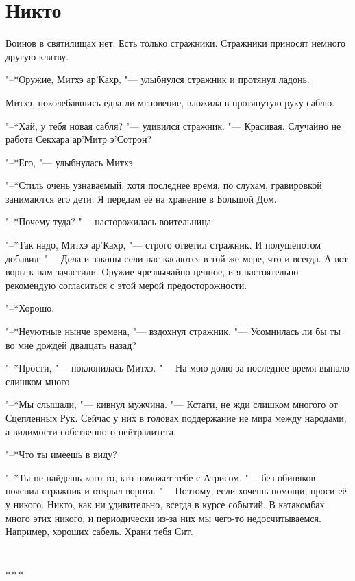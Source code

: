 \documentclass[a4paper,10pt,fleqn]{book}
\newcommand{\razd}{~\\{\centering\Large\bfseries$\ast \ast \ast$\par}~\\}
\begin{document}
\section{Никто}

Воинов в святилищах нет.
Есть только стражники.
Стражники приносят немного другую клятву.

"--*Оружие, Митхэ ар'Кахр, "--- улыбнулся стражник и протянул ладонь.

Митхэ, поколебавшись едва ли мгновение, вложила в протянутую руку саблю.

"--*Хай, у тебя новая сабля? "--- удивился стражник.
"--- Красивая.
Случайно не работа Секхара ар'Митр э'Сотрон?

"--*Его, "--- улыбнулась Митхэ.

"--*Стиль очень узнаваемый, хотя последнее время, по слухам, гравировкой занимаются его дети.
Я передам её на хранение в Большой Дом.

"--*Почему туда? "--- насторожилась воительница.

"--*Так надо, Митхэ ар'Кахр, "--- строго ответил стражник.
И полушёпотом добавил:
"--- Дела и законы сели нас касаются в той же мере, что и всегда.
А вот воры к нам зачастили.
Оружие чрезвычайно ценное, и я настоятельно рекомендую согласиться с этой мерой предосторожности.

"--*Хорошо.

"--*Неуютные нынче времена, "--- вздохнул стражник.
"--- Усомнилась ли бы ты во мне дождей двадцать назад?

"--*Прости, "--- поклонилась Митхэ.
"--- На мою долю за последнее время выпало слишком много.

"--*Мы слышали, "--- кивнул мужчина.
"--- Кстати, не жди слишком многого от Сцепленных Рук.
Сейчас у них в головах поддержание не мира между народами, а видимости собственного нейтралитета.

"--*Что ты имеешь в виду?

"--*Ты не найдешь кого-то, кто поможет тебе с Атрисом, "--- без обиняков пояснил стражник и открыл ворота.
"--- Поэтому, если хочешь помощи, проси её у никого.
Никто, как ни удивительно, всегда в курсе событий.
В катакомбах много этих никого, и периодически из-за них мы чего-то недосчитываемся.
Например, хороших сабель.
Храни тебя Сит.

\razd
\end{document}
